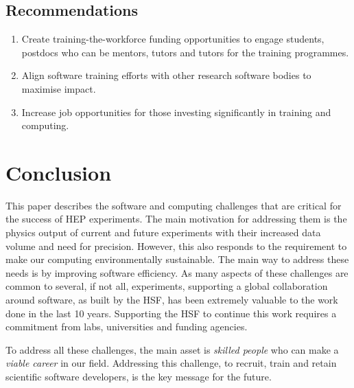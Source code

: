 \documentclass[10pt,a4paper]{article}
\begin{document}
\subsection{Recommendations}\label{recommendations-4}

\begin{enumerate}
\def\labelenumi{\arabic{enumi}.}
\item
  Create training-the-workforce funding opportunities to engage
  students, postdocs who can be mentors, tutors and tutors for the
  training programmes.
\item
  Align software training efforts with other research software bodies to
  maximise impact.
\item
  Increase job opportunities for those investing significantly in
  training and computing.
\end{enumerate}

\section{Conclusion}\label{conclusion}

This paper describes the software and computing challenges that are
critical for the success of HEP experiments. The main motivation for
addressing them is the physics output of current and future experiments
with their increased data volume and need for precision. However, this
also responds to the requirement to make our computing environmentally
sustainable. The main way to address these needs is by improving
software efficiency. As many aspects of these challenges are common to
several, if not all, experiments, supporting a global collaboration
around software, as built by the HSF, has been extremely valuable to the
work done in the last 10 years. Supporting the HSF to continue this work
requires a commitment from labs, universities and funding agencies.

To address all these challenges, the main asset is \emph{skilled people}
who can make a \emph{viable career} in our field. Addressing this
challenge, to recruit, train and retain scientific software developers,
is the key message for the future.

\newpage
\sloppy
\printbibliography
\end{document}
